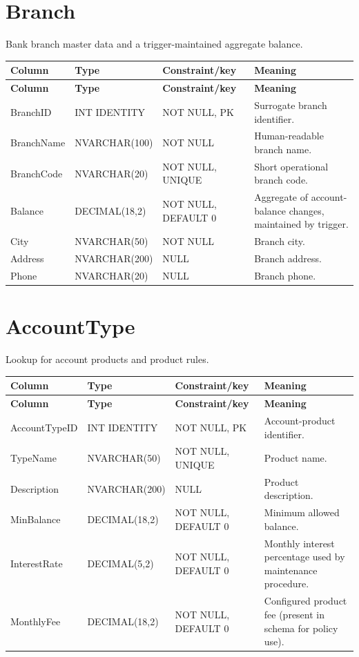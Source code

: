 \documentclass[11pt,a4paper,oneside]{report}
\begin{document}
\section{Branch}
Bank branch master data and a trigger-maintained aggregate balance.
\begin{longtable}{L{0.21\textwidth}L{0.18\textwidth}L{0.24\textwidth}L{0.31\textwidth}}
\toprule
\textbf{Column} & \textbf{Type} & \textbf{Constraint/key} & \textbf{Meaning}\\
\midrule\endfirsthead
\toprule\textbf{Column} & \textbf{Type} & \textbf{Constraint/key} & \textbf{Meaning}\\\midrule\endhead
BranchID & INT IDENTITY & NOT NULL, PK & Surrogate branch identifier.\\
BranchName & NVARCHAR(100) & NOT NULL & Human-readable branch name.\\
BranchCode & NVARCHAR(20) & NOT NULL, UNIQUE & Short operational branch code.\\
Balance & DECIMAL(18,2) & NOT NULL, DEFAULT 0 & Aggregate of account-balance changes, maintained by trigger.\\
City & NVARCHAR(50) & NOT NULL & Branch city.\\
Address & NVARCHAR(200) & NULL & Branch address.\\
Phone & NVARCHAR(20) & NULL & Branch phone.\\
\bottomrule
\end{longtable}

\section{AccountType}
Lookup for account products and product rules.
\begin{longtable}{L{0.21\textwidth}L{0.18\textwidth}L{0.24\textwidth}L{0.31\textwidth}}
\toprule
\textbf{Column} & \textbf{Type} & \textbf{Constraint/key} & \textbf{Meaning}\\
\midrule\endfirsthead
\toprule\textbf{Column} & \textbf{Type} & \textbf{Constraint/key} & \textbf{Meaning}\\\midrule\endhead
AccountTypeID & INT IDENTITY & NOT NULL, PK & Account-product identifier.\\
TypeName & NVARCHAR(50) & NOT NULL, UNIQUE & Product name.\\
Description & NVARCHAR(200) & NULL & Product description.\\
MinBalance & DECIMAL(18,2) & NOT NULL, DEFAULT 0 & Minimum allowed balance.\\
InterestRate & DECIMAL(5,2) & NOT NULL, DEFAULT 0 & Monthly interest percentage used by maintenance procedure.\\
MonthlyFee & DECIMAL(18,2) & NOT NULL, DEFAULT 0 & Configured product fee (present in schema for policy use).\\
\bottomrule
\end{longtable}
\end{document}
